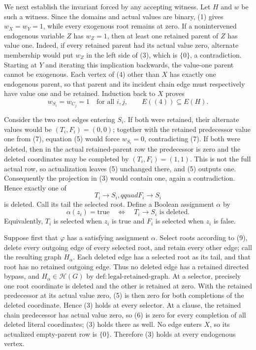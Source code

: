 We next establish the invariant forced by any accepting witness.  Let \(H\) and \(w\) be such a witness.  Since the domains and actual values are binary, (1) gives \(w_X=w_Y=1\), while every exogenous root remains at zero.  If a nonintervened endogenous variable \(Z\) has \(w_Z=1\), then at least one retained parent of \(Z\) has value one.  Indeed, if every retained parent had its actual value zero, alternate membership would put \(w_Z\) in the left side of (3), which is \(\{0\}\), a contradiction.  Starting at \(Y\) and iterating this implication backwards, the value-one parent cannot be exogenous.  Each vertex of (4) other than \(X\) has exactly one endogenous parent, so that parent and its incident chain edge must respectively have value one and be retained.  Induction back to \(X\) proves
\[
 w_{S_i}=w_{C_j}=1\quad\text{for all \(i,j\)},
 \qquad E((4))\subseteq E(H).                                                       \tag{7}
\]

Consider the two root edges entering \(S_i\).  If both were retained, their alternate values would be \((T_i,F_i)=(0,0)\); together with the retained predecessor value one from (7), equation (5) would force \(w_{S_i}=0\), contradicting (7).  If both were deleted, then in the actual retained-parent row the predecessor is zero and the deleted coordinates may be completed by \((T_i,F_i)=(1,1)\).  This is not the full actual row, so actualization leaves (5) unchanged there, and (5) outputs one.  Consequently the projection in (3) would contain one, again a contradiction.  Hence exactly one of
\[
 T_i\to S_i,qquad F_i\to S_i                                                       \tag{8}
\]
is deleted.  Call its tail the selected root.  Define a Boolean assignment \(\alpha\) by
\[
 \alpha(z_i)=\mathrm{true}\quad\Longleftrightarrow\quad T_i\to S_i\text{ is deleted}. \tag{9}
\]
Equivalently, \(T_i\) is selected when \(z_i\) is true and \(F_i\) is selected when \(z_i\) is false.

Suppose first that \(\varphi\) has a satisfying assignment \(\alpha\).  Select roots according to (9), delete every outgoing edge of every selected root, and retain every other edge; call the resulting graph \(H_\alpha\).  Each deleted edge has a selected root as its tail, and that root has no retained outgoing edge.  Thus no deleted edge has a retained directed bypass, and \(H_\alpha\in\mathcal H(G)\) by \(\mathrm{def:legal\mbox{-}retained\mbox{-}graph}\).  At a selector, precisely one root coordinate is deleted and the other is retained at zero.  With the retained predecessor at its actual value zero, (5) is then zero for both completions of the deleted coordinate.  Hence (3) holds at every selector.  At a clause, the retained chain predecessor has actual value zero, so (6) is zero for every completion of all deleted literal coordinates; (3) holds there as well.  No edge enters \(X\), so its actualized empty-parent row is \(\{0\}\).  Therefore (3) holds at every endogenous vertex.

